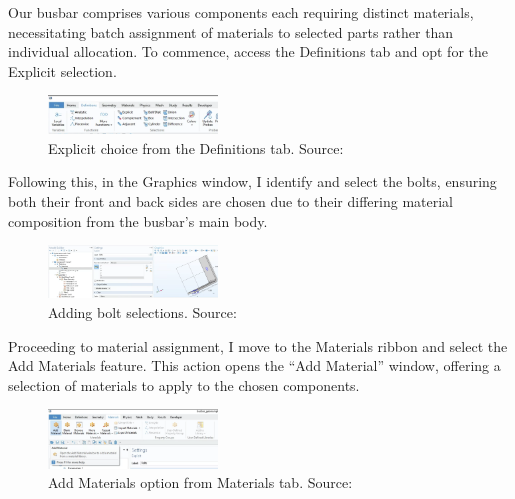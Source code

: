 Our busbar comprises various components each requiring distinct materials, necessitating batch assignment of materials to selected parts rather than individual allocation. To commence, access the Definitions tab and opt for the Explicit selection.

\begin{figure}[ht!]
  \centering
  \includegraphics[width=0.4\textwidth]{Chapters/Figures/Chapter 3 Figures/Explicit Choice Selection from Definitions Tab.png}
  \caption{Explicit choice from the Definitions tab. Source: \cite{multiphysics__modeling_nodate}}
  \label{fig:Explicit choice from the Definitions tab.}
\end{figure}

Following this, in the Graphics window, I identify and select the bolts, ensuring both their front and back sides are chosen due to their differing material composition from the busbar's main body.

\begin{figure}[ht!]
  \centering
  \includegraphics[width=0.4\textwidth]{Chapters/Figures/Chapter 3 Figures/Bolts Selection.png}
  \caption{Adding bolt selections. Source: \cite{multiphysics__modeling_nodate}}
  \label{fig:Adding bolt selections}
\end{figure}

Proceeding to material assignment, I move to the Materials ribbon and select the Add Materials feature. This action opens the ``Add Material'' window, offering a selection of materials to apply to the chosen components.

\begin{figure}[ht!]
  \centering
  \includegraphics[width=0.4\textwidth]{Chapters/Figures/Chapter 3 Figures/Add Material Button.png}
  \caption{Add Materials option from Materials tab. Source: \cite{multiphysics__modeling_nodate}}
  \label{fig:Add Materials option from Materials tab.}
\end{figure}

